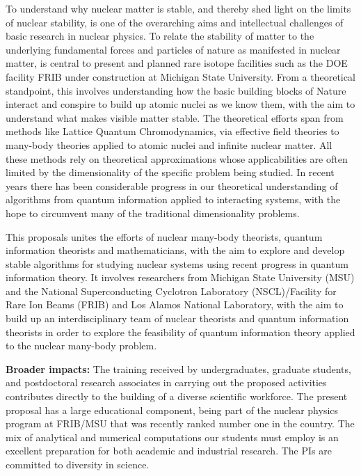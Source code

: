 \documentclass[10pt]{article}
\begin{document}
To understand why nuclear matter is stable, and thereby shed light on
the limits of nuclear stability, is one of the overarching aims and
intellectual challenges of basic research in nuclear physics. To
relate the stability of matter to the underlying fundamental forces
and particles of nature as manifested in nuclear matter, is central to
present and planned rare isotope facilities such as the DOE facility
FRIB under construction at Michigan State University.  From a
theoretical standpoint, this involves understanding how the basic
building blocks of Nature interact and conspire to build up atomic
nuclei as we know them, with the aim to understand what makes visible
matter stable.  The theoretical efforts span from methods like Lattice
Quantum Chromodynamics, via effective field theories to many-body
theories applied to atomic nuclei and infinite nuclear matter. All
these methods rely on theoretical approximations whose applicabilities
are often limited by the dimensionality of the specific problem being
studied. In recent years there has been considerable progress in our
theoretical understanding of algorithms from quantum information
applied to interacting systems, with the hope to circumvent many of
the traditional dimensionality problems.


This proposals unites the efforts of nuclear many-body theorists,
quantum information theorists and mathematicians, with the aim to
explore and develop stable algorithms for studying nuclear systems
using recent progress in quantum information theory. It involves
researchers from Michigan State University (MSU) and the National
Superconducting Cyclotron Laboratory (NSCL)/Facility for Rare Ion
Beams (FRIB) and Los Alamos National Laboratory, with the aim to build
up an interdisciplinary team of nuclear theorists and quantum
information theorists in order to explore the feasibility of quantum
information theory applied to the nuclear many-body problem.


{\bf Broader impacts:} The training received by undergraduates,
graduate students, and postdoctoral research associates in carrying
out the proposed activities contributes directly to the building of a
diverse scientific workforce. The present proposal has a large
educational component, being part of the nuclear physics program at
FRIB/MSU that was recently ranked number one in the country. The mix
of analytical and numerical computations our students must employ is
an excellent preparation for both academic and industrial research. The
PIs are committed to diversity in science.
\end{document}
